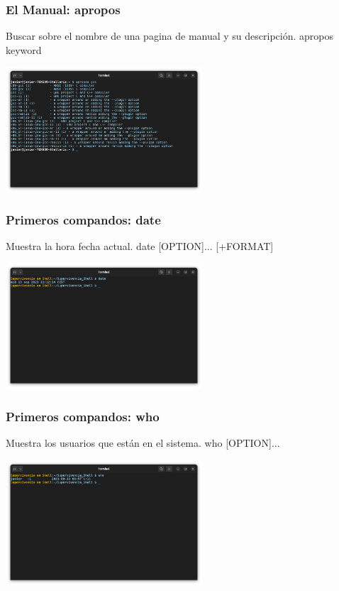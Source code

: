 \documentclass[10pt]{beamer}
\begin{document}
	\begin{frame}
		\frametitle{El Manual: apropos}
		\begin{alertblock}{Buscar sobre el nombre de una pagina de manual y su descripción.}
			apropos keyword
		\end{alertblock}
		\begin{center}
			\includegraphics[width=0.55\textwidth]{apropos}
		\end{center}
	\end{frame}

	\begin{frame}
		\frametitle{Primeros compandos: date}
		\begin{alertblock}{Muestra la hora fecha actual.}
			date [OPTION]... [+FORMAT]
		\end{alertblock}
		\begin{center}
			\includegraphics[width=0.55\textwidth]{date}
		\end{center}
	\end{frame}
	
	\begin{frame}
		\frametitle{Primeros compandos: who}
		\begin{alertblock}{Muestra los usuarios que están en el sistema.}
			who [OPTION]...
		\end{alertblock}
		\begin{center}
			\includegraphics[width=0.55\textwidth]{who}
		\end{center}
	\end{frame}
	
\end{document}
